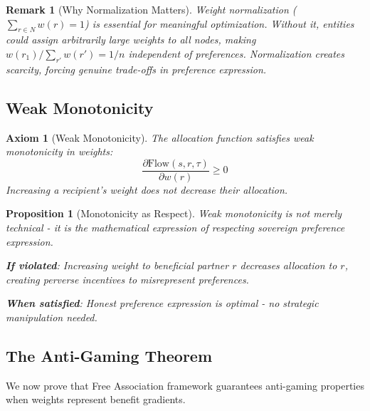 \documentclass[11pt]{article}
\newtheorem{proposition}{Proposition}
\newtheorem{remark}{Remark}
\newtheorem{axiom}{Axiom}
\begin{document}
\begin{remark}[Why Normalization Matters]
Weight normalization ($\sum_{r \in N} w(r) = 1$) is essential for meaningful optimization. Without it, entities could assign arbitrarily large weights to all nodes, making $w(r_1)/\sum_{r'} w(r') = 1/n$ independent of preferences. Normalization creates scarcity, forcing genuine trade-offs in preference expression.
\end{remark}

\subsection{Weak Monotonicity}

\begin{axiom}[Weak Monotonicity]
\label{ax:weak-monotonicity}
The allocation function satisfies weak monotonicity in weights:
\[
\frac{\partial \text{Flow}(s, r, \tau)}{\partial w(r)} \geq 0
\]
Increasing a recipient's weight does not decrease their allocation.
\end{axiom}

\begin{proposition}[Monotonicity as Respect]
Weak monotonicity is not merely technical - it is the mathematical expression of respecting sovereign preference expression.

\textbf{If violated}: Increasing weight to beneficial partner $r$ decreases allocation to $r$, creating perverse incentives to misrepresent preferences.

\textbf{When satisfied}: Honest preference expression is optimal - no strategic manipulation needed.
\end{proposition}

\subsection{The Anti-Gaming Theorem}

We now prove that Free Association framework guarantees anti-gaming properties when weights represent benefit gradients.
\end{document}
